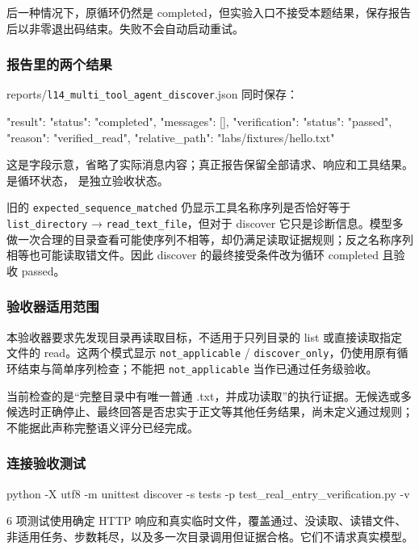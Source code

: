 后一种情况下，原循环仍然是 completed，但实验入口不接受本题结果，保存报告后以非零退出码结束。失败不会自动启动重试。

\subsubsection{报告里的两个结果}

reports/\nolinkurl{l14_multi_tool_agent_discover}.json 同时保存：

\begin{Code}
{
  "result": {"status": "completed", "messages": []},
  "verification": {
    "status": "passed",
    "reason": "verified_read",
    "relative_path": "labs/fixtures/hello.txt"
  }
}
\end{Code}

这是字段示意，省略了实际消息内容；真正报告保留全部请求、响应和工具结果。 是循环状态， 是独立验收状态。

旧的 \nolinkurl{expected_sequence_matched} 仍显示工具名称序列是否恰好等于 \nolinkurl{list_directory} → \nolinkurl{read_text_file}，但对于 discover 它只是诊断信息。模型多做一次合理的目录查看可能使序列不相等，却仍满足读取证据规则；反之名称序列相等也可能读取错文件。因此 discover 的最终接受条件改为循环 completed 且验收 passed。

\subsubsection{验收器适用范围}

本验收器要求先发现目录再读取目标，不适用于只列目录的 list 或直接读取指定文件的 read。这两个模式显示 \nolinkurl{not_applicable} / \nolinkurl{discover_only}，仍使用原有循环结束与简单序列检查；不能把 \nolinkurl{not_applicable} 当作已通过任务级验收。

当前检查的是“完整目录中有唯一普通 .txt，并成功读取”的执行证据。无候选或多候选时正确停止、最终回答是否忠实于正文等其他任务结果，尚未定义通过规则；不能据此声称完整语义评分已经完成。

\subsubsection{连接验收测试}

\begin{Code}
python -X utf8 -m unittest discover -s tests -p test_real_entry_verification.py -v
\end{Code}

6 项测试使用确定 HTTP 响应和真实临时文件，覆盖通过、没读取、读错文件、非适用任务、步数耗尽，以及多一次目录调用但证据合格。它们不请求真实模型。

